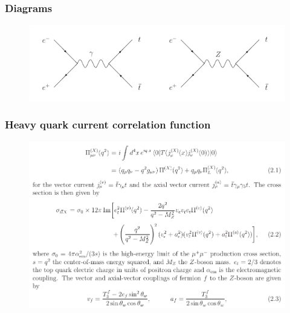 \documentclass[8pt,dvipsnames,table]{beamer}
\begin{document}
\section{\citet{Beneke:2013jia}}
\begin{frame}
	\frametitle{Diagrams}

	\begin{figure}[!htb]
		\centering
		\includegraphics[width=\linewidth]{image20.png}
		\label{fig:image20}
	\end{figure}


\end{frame}
\begin{frame}
	\frametitle{Heavy quark current correlation function}

	\begin{figure}[!htb]
		\centering
		\includegraphics[width=\linewidth]{image21.png}
		\label{fig:image21}
	\end{figure}


\end{frame}
\end{document}
